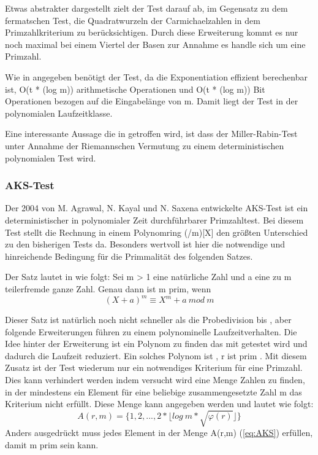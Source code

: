  		Etwas abstrakter dargestellt zielt der Test darauf ab, im Gegensatz zu dem fermatschen Test, die Quadratwurzeln der Carmichaelzahlen in dem Primzahlkriterium zu berücksichtigen. Durch diese Erweiterung kommt es nur noch maximal bei einem Viertel der Basen zur Annahme es handle sich um eine Primzahl.
 		
 		Wie in \cite{Algebraische:und:zahlentheoretische:Grundlagen:fuer:die:Informatik} angegeben benötigt der Test, da die Exponentiation effizient berechenbar ist, O(t * (log m)) arithmetische Operationen und O(t * (log m)) Bit Operationen bezogen auf die Eingabelänge von m. Damit liegt der Test in der polynomialen Laufzeitklasse.
 		
 		Eine interessante Aussage die in \cite{Algorithmische:Zahlentheorie} getroffen wird, ist dass der Miller-Rabin-Test unter Annahme der Riemannschen Vermutung zu einem deterministischen polynomialen Test wird.
 		


		\subsubsection{AKS-Test}
		Der 2004 von M. Agrawal, N. Kayal und N. Saxena entwickelte AKS-Test ist ein deterministischer in polynomialer Zeit durchführbarer Primzahltest. Bei diesem Test stellt die Rechnung in einem Polynomring (/m)[X] den größten Unterschied zu den bisherigen Tests da. Besonders wertvoll ist hier die notwendige und hinreichende Bedingung für die Primmalität des folgenden Satzes. 
		
		Der Satz lautet in \cite{Algorithmische:Zahlentheorie} wie folgt:
		Sei m > 1 eine natürliche Zahl und a eine zu m teilerfremde ganze
		Zahl. Genau dann ist m prim, wenn
		\begin{displaymath} 
			(X + a)^m \equiv X^m + a~mod~m
		\end{displaymath}
		
		Dieser Satz ist natürlich noch nicht schneller als die Probedivision bis , aber folgende Erweiterungen führen zu einem polynominelle Laufzeitverhalten. Die Idee hinter der Erweiterung ist ein Polynom zu finden das mit getestet wird und dadurch die Laufzeit reduziert. Ein solches Polynom ist , r ist prim . Mit diesem Zusatz ist der Test wiederum nur ein notwendiges Kriterium für eine Primzahl. Dies kann verhindert werden indem versucht wird eine Menge Zahlen zu finden, in der mindestens ein Element für eine beliebige zusammengesetzte Zahl m das Kriterium nicht erfüllt. Diese Menge kann angegeben werden und lautet wie folgt:
		\begin{displaymath}
			A(r,m) = \{1, 2, . . . , 2 * \lfloor log~m *\sqrt{\varphi(r)} \rfloor\}
		\end{displaymath}
		Anders ausgedrückt muss jedes Element in der Menge A(r,m) (\ref{eq:AKS}) erfüllen, damit m prim sein kann.
		

